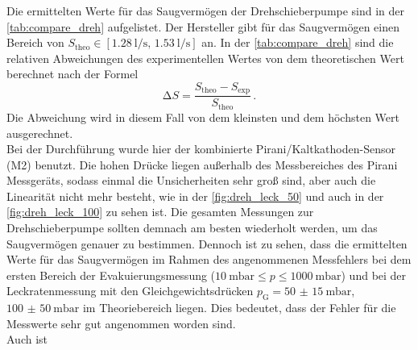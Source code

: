 \noindent Die ermittelten Werte für das Saugvermögen der Drehschieberpumpe sind in der \autoref{tab:compare_dreh} aufgelistet. Der Hersteller gibt für das Saugvermögen einen Bereich 
von $ S_\text{theo} \in [\SI{1.28}{\litre\per\second},\, \SI{1.53}{\litre\per\second}]$ \cite{anleitung} an. In der \autoref{tab:compare_dreh} sind die relativen Abweichungen des experimentellen Wertes von 
dem theoretischen Wert berechnet nach der Formel 
\begin{equation}
    \increment S = \frac{S_\text{theo} - S_\text{exp}}{S_\text{theo}}\, .
    \label{eqn:rel_abw}
\end{equation}
Die Abweichung wird in diesem Fall von dem kleinsten und dem höchsten Wert ausgerechnet. \\
Bei der Durchführung wurde hier der kombinierte Pirani/Kaltkathoden-Sensor (M2) benutzt. Die hohen Drücke liegen außerhalb des Messbereiches des Pirani Messgeräts, 
sodass einmal die Unsicherheiten sehr groß sind, aber auch die Linearität nicht mehr besteht, wie in der \autoref{fig:dreh_leck_50} und auch in der \autoref{fig:dreh_leck_100} zu sehen ist. 
Die gesamten Messungen zur Drehschieberpumpe sollten demnach am besten wiederholt werden, um das Saugvermögen genauer zu bestimmen. 
Dennoch ist zu sehen, dass die ermittelten Werte für das Saugvermögen im Rahmen des angenommenen Messfehlers bei dem ersten Bereich der Evakuierungsmessung 
($\SI{10}{\milli\bar} \leq p \leq \SI{1000}{\milli\bar}$) und bei der Leckratenmessung mit den Gleichgewichtsdrücken $p_\text{G} = \SI{50(15)}{\milli\bar}$, $\SI{100(50)}{\milli\bar}$ im Theoriebereich liegen. 
Dies bedeutet, dass der Fehler für die Messwerte sehr gut angenommen worden sind. \\
Auch ist 
